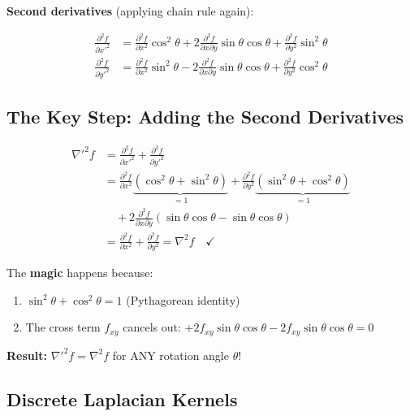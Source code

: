 \documentclass[12pt,a4paper]{article}
\begin{document}
\textbf{Second derivatives} (applying chain rule again):

\begin{align*}
\frac{\partial^2 f}{\partial x'^2} &= \frac{\partial^2 f}{\partial x^2}\cos^2\theta + 2\frac{\partial^2 f}{\partial x \partial y}\sin\theta\cos\theta + \frac{\partial^2 f}{\partial y^2}\sin^2\theta \\[0.8em]
\frac{\partial^2 f}{\partial y'^2} &= \frac{\partial^2 f}{\partial x^2}\sin^2\theta - 2\frac{\partial^2 f}{\partial x \partial y}\sin\theta\cos\theta + \frac{\partial^2 f}{\partial y^2}\cos^2\theta
\end{align*}

\subsection{The Key Step: Adding the Second Derivatives}

\begin{align*}
\nabla'^2 f &= \frac{\partial^2 f}{\partial x'^2} + \frac{\partial^2 f}{\partial y'^2} \\[0.8em]
&= \frac{\partial^2 f}{\partial x^2}\underbrace{(\cos^2\theta + \sin^2\theta)}_{= 1} + \frac{\partial^2 f}{\partial y^2}\underbrace{(\sin^2\theta + \cos^2\theta)}_{= 1} \\[0.5em]
&\quad + 2\frac{\partial^2 f}{\partial x \partial y}(\sin\theta\cos\theta - \sin\theta\cos\theta) \\[0.8em]
&= \frac{\partial^2 f}{\partial x^2} + \frac{\partial^2 f}{\partial y^2} = \nabla^2 f \quad \checkmark
\end{align*}

\begin{keypoint}
The \textbf{magic} happens because:
\begin{enumerate}
    \item $\sin^2\theta + \cos^2\theta = 1$ (Pythagorean identity)
    \item The cross term $f_{xy}$ cancels out: $+2f_{xy}\sin\theta\cos\theta - 2f_{xy}\sin\theta\cos\theta = 0$
\end{enumerate}

\textbf{Result:} $\nabla'^2 f = \nabla^2 f$ for ANY rotation angle $\theta$!
\end{keypoint}

\subsection{Discrete Laplacian Kernels}
\end{document}
